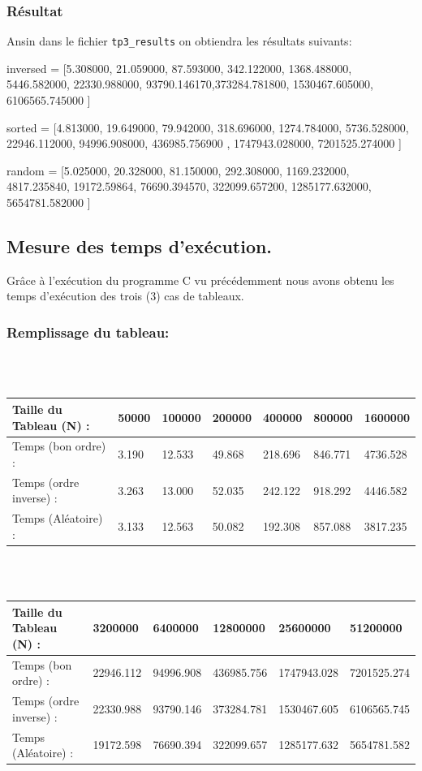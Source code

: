 \documentclass[12pt]{article}
\begin{document}
\subsubsection{Résultat}
Ansin dans le fichier \texttt{tp3\_results} on obtiendra les résultats suivants:
\begin{sql}
inversed = [5.308000, 21.059000, 87.593000, 342.122000, 1368.488000,
 5446.582000, 22330.988000, 93790.146170,373284.781800, 1530467.605000,
  6106565.745000  ]
  
sorted = [4.813000, 19.649000, 79.942000, 318.696000, 1274.784000, 
5736.528000, 22946.112000, 94996.908000, 436985.756900 , 1747943.028000,
 7201525.274000 ]
 
random = [5.025000, 20.328000, 81.150000, 292.308000, 1169.232000, 
4817.235840, 19172.59864, 76690.394570, 322099.657200, 1285177.632000,
 5654781.582000 ]
\end{sql}

\subsection{Mesure des temps d'exécution.}
Grâce à l'exécution du programme C vu précédemment nous avons obtenu les temps d'exécution des trois (3) cas de tableaux.

\subsubsection{Remplissage du tableau:}
\color{blue}
\textrm{  }
\\
\\
\begin{tabular}{|p{3cm}||p{1.8cm}|p{1.8cm}|p{1.8cm}|p{1.8cm}|p{1.8cm}|p{1.8cm}|}
\hline
Taille du Tableau (N) : & 50000 & 100000 & 200000 & 400000 & 800000  & 1600000\\
\hline
Temps (bon ordre) : & 3.190 & 12.533 & 49.868 & 218.696 & 846.771 & 4736.528 \\
\hline

Temps (ordre inverse) :  & 3.263 & 13.000 & 52.035 & 242.122 & 918.292 & 4446.582 \\
\hline

Temps (Aléatoire) : & 3.133 & 12.563 & 50.082 & 192.308 & 857.088 & 3817.235 \\
\hline
\end{tabular}
\\
\\
\begin{tabular}{|p{3cm}||p{2cm}|p{2cm}|p{2cm}|p{2cm}|p{2cm}|}
\hline
Taille du Tableau (N) : & 3200000 & 6400000 & 12800000 & 25600000 &  51200000  \\
\hline

Temps (bon ordre) : & 22946.112 & 94996.908 & 436985.756 & 1747943.028 & 7201525.274  \\
\hline

Temps (ordre inverse) : &  22330.988 & 93790.146 & 373284.781 & 1530467.605 &  6106565.745  \\
\hline

Temps (Aléatoire) : & 19172.598 & 76690.394 & 322099.657 & 1285177.632 & 5654781.582  \\
\hline
\end{tabular}
\end{document}
